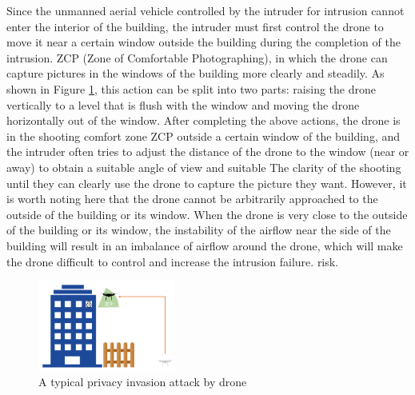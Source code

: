 \documentclass{sig-alternate-10pt}
\begin{document}
Since the unmanned aerial vehicle controlled by the intruder for intrusion cannot enter the interior of the building, the intruder must first control the drone to move it near a certain window outside the building during the completion of the intrusion. ZCP (Zone of Comfortable Photographing), in which the drone can capture pictures in the windows of the building more clearly and steadily. As shown in Figure \ref{zcp}, this action can be split into two parts: raising the drone vertically to a level that is flush with the window and moving the drone horizontally out of the window. After completing the above actions, the drone is in the shooting comfort zone ZCP outside a certain window of the building, and the intruder often tries to adjust the distance of the drone to the window (near or away) to obtain a suitable angle of view and suitable The clarity of the shooting until they can clearly use the drone to capture the picture they want. However, it is worth noting here that the drone cannot be arbitrarily approached to the outside of the building or its window. When the drone is very close to the outside of the building or its window, the instability of the airflow near the side of the building will result in an imbalance of airflow around the drone, which will make the drone difficult to control and increase the intrusion failure. risk.
\begin{figure}[!h]
	\centering
	\includegraphics[width=0.4\textwidth]{pics/zcp.png}
	\caption{A typical privacy invasion attack by drone}
	\label{zcp}
\end{figure}
\end{document}

